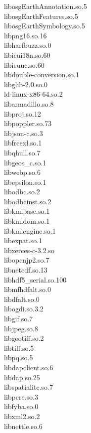 \begin{multicols}{2}
libosgEarthAnnotation.so.5 \\
libosgEarthFeatures.so.5 \\
libosgEarthSymbology.so.5 \\
libpng16.so.16 \\
libharfbuzz.so.0 \\
libicui18n.so.60 \\
libicuuc.so.60 \\
libdouble-conversion.so.1 \\
libglib-2.0.so.0 \\
ld-linux-x86-64.so.2 \\
libarmadillo.so.8 \\
libproj.so.12 \\
libpoppler.so.73 \\
libjson-c.so.3 \\
libfreexl.so.1 \\
libqhull.so.7 \\
libgeos\_c.so.1 \\
libwebp.so.6 \\
libepsilon.so.1 \\
libodbc.so.2 \\
libodbcinst.so.2 \\
libkmlbase.so.1 \\
libkmldom.so.1 \\
libkmlengine.so.1 \\
libexpat.so.1 \\
libxerces-c-3.2.so \\
libopenjp2.so.7 \\
libnetcdf.so.13 \\
libhdf5\_serial.so.100 \\
libmfhdfalt.so.0 \\
libdfalt.so.0 \\
libogdi.so.3.2 \\
libgif.so.7 \\
libjpeg.so.8 \\
libgeotiff.so.2 \\
libtiff.so.5 \\
libpq.so.5 \\
libdapclient.so.6 \\
libdap.so.25 \\
libspatialite.so.7 \\
libpcre.so.3 \\
libfyba.so.0 \\
libxml2.so.2 \\
libnettle.so.6 \\

\end{multicols}
